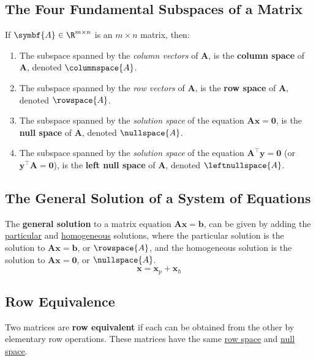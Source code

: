 \documentclass{article}
\begin{document}
\subsection{The Four Fundamental Subspaces of a Matrix}
\begin{definition}
    If \(\symbf{A}\in\R^{m \times n}\) is an \(m \times n\) matrix, then:
    \begin{enumerate}
        \item The subspace spanned by the \textit{column vectors} of
              \(\symbf{A}\), is the \textbf{column space} of
              \(\symbf{A}\), denoted \(\columnspace{A}\).
        \item The subspace spanned by the \textit{row vectors} of
              \(\symbf{A}\), is the \textbf{row space} of
              \(\symbf{A}\), denoted \(\rowspace{A}\).
        \item The subspace spanned by the \textit{solution space} of
              the equation \(\symbf{A}\symbf{x}=\symbf{0}\), is the
              \textbf{null space} of \(\symbf{A}\), denoted
              \(\nullspace{A}\).
        \item The subspace spanned by the \textit{solution space} of
              the equation \(\symbf{A}^{\top}\symbf{y}=\symbf{0}\) (or
              \(\symbf{y}^{\top}\symbf{A}=\symbf{0}\)), is the
              \textbf{left null space} of \(\symbf{A}\), denoted
              \(\leftnullspace{A}\).
    \end{enumerate}
\end{definition}
\subsection{The General Solution of a System of Equations}
\begin{theorem}
    The \textbf{general solution} to a matrix equation
    \(\symbf{A}\symbf{x}=\symbf{b}\), can be given by adding the
    \underline{particular} and \underline{homogeneous} solutions, where
    the particular solution is the solution to
    \(\symbf{A}\symbf{x}=\symbf{b}\), or \(\rowspace{A}\), and the
    homogeneous solution is the solution to
    \(\symbf{A}\symbf{x}=\symbf{0}\), or \(\nullspace{A}\).
    \begin{equation*}
        \symbf{x} = \symbf{x}_p + \symbf{x}_h
    \end{equation*}
\end{theorem}
\subsection{Row Equivalence}
\begin{definition}
    Two matrices are \textbf{row equivalent} if each can be obtained
    from the other by elementary row operations. These matrices have the
    same \underline{row space} and \underline{null space}.
\end{definition}
\end{document}

